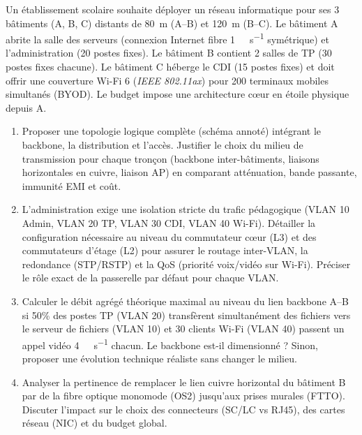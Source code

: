 \documentclass[11pt]{article}
\begin{document}
\begin{exercice}
Un établissement scolaire souhaite déployer un réseau informatique pour ses 3 bâtiments (A, B, C) distants de \SI{80}{\meter} (A--B) et \SI{120}{\meter} (B--C). Le bâtiment A abrite la salle des serveurs (connexion Internet fibre \SI{1}{\giga\bit\per\second} symétrique) et l'administration (20 postes fixes). Le bâtiment B contient 2 salles de TP (30 postes fixes chacune). Le bâtiment C héberge le CDI (15 postes fixes) et doit offrir une couverture Wi-Fi 6 (\textit{IEEE 802.11ax}) pour 200 terminaux mobiles simultanés (BYOD). Le budget impose une architecture cœur en étoile physique depuis A.
\begin{enumerate}
    \item Proposer une topologie logique complète (schéma annoté) intégrant le backbone, la distribution et l'accès. Justifier le choix du milieu de transmission pour chaque tronçon (backbone inter-bâtiments, liaisons horizontales en cuivre, liaison AP) en comparant atténuation, bande passante, immunité EMI et coût.
    \item L'administration exige une isolation stricte du trafic pédagogique (VLAN 10 Admin, VLAN 20 TP, VLAN 30 CDI, VLAN 40 Wi-Fi). Détailler la configuration nécessaire au niveau du commutateur cœur (L3) et des commutateurs d'étage (L2) pour assurer le routage inter-VLAN, la redondance (STP/RSTP) et la QoS (priorité voix/vidéo sur Wi-Fi). Préciser le rôle exact de la passerelle par défaut pour chaque VLAN.
    \item Calculer le débit agrégé théorique maximal au niveau du lien backbone A--B si 50\% des postes TP (VLAN 20) transfèrent simultanément des fichiers vers le serveur de fichiers (VLAN 10) et 30 clients Wi-Fi (VLAN 40) passent un appel vidéo \SI{4}{\mega\bit\per\second} chacun. Le backbone est-il dimensionné ? Sinon, proposer une évolution technique réaliste sans changer le milieu.
    \item Analyser la pertinence de remplacer le lien cuivre horizontal du bâtiment B par de la fibre optique monomode (OS2) jusqu'aux prises murales (FTTO). Discuter l'impact sur le choix des connecteurs (SC/LC vs RJ45), des cartes réseau (NIC) et du budget global.
\end{enumerate}
\end{exercice}
\end{document}

